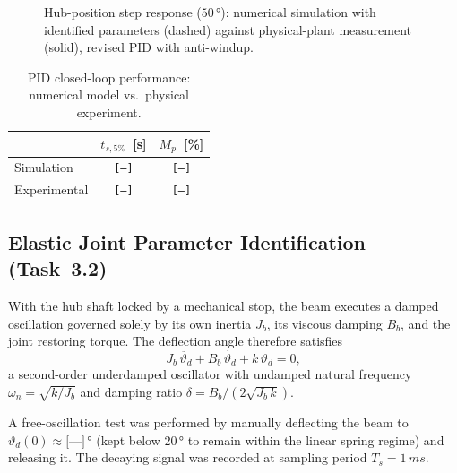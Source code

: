 \documentclass[11pt]{article}
\newcommand{\thd}{\vartheta_d}
\newcommand{\wn}{\omega_n}
\begin{document}
\begin{figure}[H]
    \centering
    \caption{Hub-position step response ($50\,\si{\degree}$): numerical simulation with
             identified parameters (dashed) against physical-plant measurement (solid),
             revised PID with anti-windup.}
    \label{fig:pid_exp_vs_sim}
\end{figure}

\begin{table}[H]
\centering
\caption{PID closed-loop performance: numerical model vs.\ physical experiment.}
\label{tab:pid_perf_exp}
\begin{tabular}{lcc}
\toprule
& $t_{s,5\%}$~[s] & $M_p$~[\%] \\
\midrule
Simulation   & \texttt{[---]} & \texttt{[---]} \\
Experimental & \texttt{[---]} & \texttt{[---]} \\
\bottomrule
\end{tabular}
\end{table}


\subsection{Elastic Joint Parameter Identification (Task~3.2)}
\label{sec:estimation}

With the hub shaft locked by a mechanical stop, the beam executes a damped oscillation
governed solely by its own inertia $J_b$, its viscous damping $B_b$, and the joint
restoring torque.  The deflection angle therefore satisfies
\begin{equation}
    J_b\,\ddot{\thd} + B_b\,\dot{\thd} + k\,\thd = 0,
    \label{eq:free_osc}
\end{equation}
a second-order underdamped oscillator with undamped natural frequency
$\wn = \sqrt{k/J_b}$ and damping ratio $\delta = B_b/(2\sqrt{J_b\,k})$.

A free-oscillation test was performed by manually deflecting the beam to
$\thd(0) \approx \texttt{[---]}\,\si{\degree}$ (kept below $20\,\si{\degree}$ to remain
within the linear spring regime) and releasing it.  The decaying signal was recorded at
sampling period $T_s = 1\,\si{ms}$.
\end{document}
